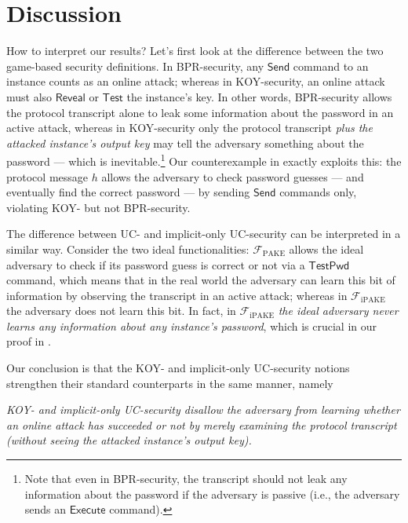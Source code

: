 \documentclass{article}
\newcommand{\func}{\mathcal{F}}
\newcommand{\Fpake}{\func_\mathrm{PAKE}}
\newcommand{\Fipake}{\func_\mathrm{iPAKE}}
\newcommand{\TestPwd}{\mathsf{TestPwd}}
\newcommand{\Execute}{\mathsf{Execute}}
\newcommand{\Send}{\mathsf{Send}}
\newcommand{\Reveal}{\mathsf{Reveal}}
\newcommand{\Test}{\mathsf{Test}}
\begin{document}
\section{Discussion}
\label{sec:conclusion}
How to interpret our results? Let's first look at the difference between the two game-based security definitions. In BPR-security, any $\Send$ command to an instance counts as an online attack; whereas in KOY-security, an online attack must also $\Reveal$ or $\Test$ the instance's key. In other words, BPR-security allows the protocol transcript alone to leak some information about the password in an active attack, whereas in KOY-security only the protocol transcript \emph{plus the attacked instance's output key} may tell the adversary something about the password --- which is inevitable.\footnote{Note that even in BPR-security, the transcript should not leak any information about the password if the adversary is passive (i.e., the adversary sends an $\Execute$ command).} Our counterexample in  exactly exploits this: the protocol message $h$ allows the adversary to check password guesses --- and eventually find the correct password --- by sending $\Send$ commands only, violating KOY- but not BPR-security.

The difference between UC- and implicit-only UC-security can be interpreted in a similar way. Consider the two ideal functionalities: $\Fpake$ allows the ideal adversary to check if its password guess is correct or not via a $\TestPwd$ command, which means that in the real world the adversary can learn this bit of information by observing the transcript in an active attack; whereas in $\Fipake$ the adversary does not learn this bit. In fact, in $\Fipake$ \emph{the ideal adversary never learns any information about any instance's password}, which is crucial in our proof in .

Our conclusion is that the KOY- and implicit-only UC-security notions strengthen their standard counterparts in the same manner, namely
\begin{framed}
\begin{displayquote}
  \emph{KOY- and implicit-only UC-security disallow the adversary from learning whether an online attack has succeeded or not by merely examining the protocol transcript (without seeing the attacked instance's output key).}
\end{displayquote}
\end{framed}
\end{document}
